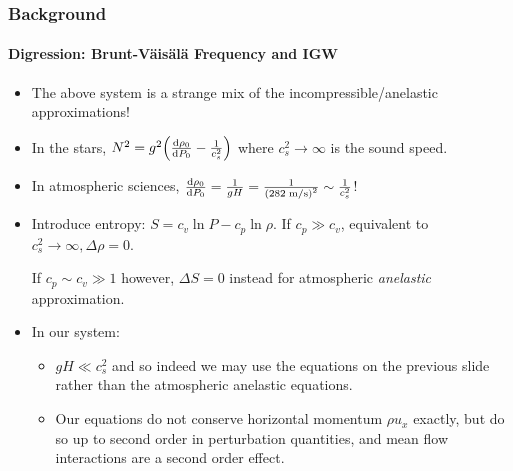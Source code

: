 \documentclass[dvipsnames, 10pt]{beamer}
\newcommand*{\rd}[2]{\frac{\mathrm{d}#1}{\mathrm{d}#2}}
\DeclarePairedDelimiter\p{\lparen}{\rparen}
\begin{document}
\begin{frame}
    \frametitle{Background}
    \framesubtitle{Digression: Brunt-V\"ais\"al\"a Frequency and IGW}

    \begin{itemize}
        \item The above system is a strange mix of the incompressible/anelastic
            approximations!

        \item In the stars, $N^2 = g^2\p*{\rd{\rho_0}{P_0} - \frac{1}{c_s^2}}$
            where $c_s^2 \to \infty$ is the sound speed.

        \item In atmospheric sciences, $\rd{\rho_0}{P_0} = \frac{1}{gH} =
            \frac{1}{\p*{282\;\mathrm{m/s}}^2} \sim \frac{1}{c_s^2}$!

        \item Introduce entropy: $S = c_v \ln P - c_p \ln \rho$. If $c_p \gg
            c_v$, equivalent to $c_s^2 \to \infty, \Delta \rho = 0$.

            If $c_p \sim c_v \gg 1$ however, $\Delta S = 0$ instead for
            atmospheric \emph{anelastic} approximation.

        \item In our system:
            \begin{itemize}
                \item $gH \ll c_s^2$ and so indeed we may use the
                    equations on the previous slide rather than the atmospheric
                    anelastic equations.
                \item Our equations do not conserve horizontal momentum $\rho
                    u_x$ exactly, but do so up to second order in perturbation
                    quantities, and mean flow interactions are a second order
                    effect.
            \end{itemize}
    \end{itemize}
\end{frame}
\end{document}

